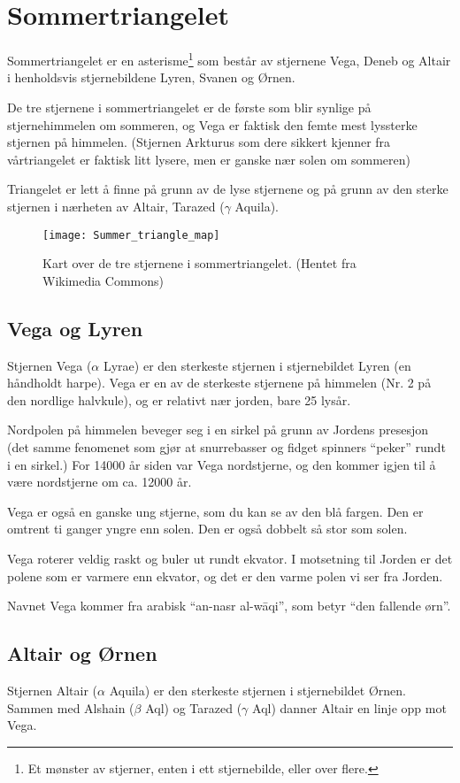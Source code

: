 \documentclass[../SommerstjernerA4.tex]{subfiles}
\begin{document}
\section{Sommertriangelet}
Sommertriangelet er en asterisme\footnote{Et mønster av stjerner, enten i ett stjernebilde, eller over flere.} som består av stjernene Vega, Deneb og Altair i henholdsvis stjernebildene Lyren, Svanen og Ørnen. 

De tre stjernene i sommertriangelet er de første som blir synlige på stjernehimmelen om sommeren, og Vega er faktisk den femte mest lyssterke stjernen på himmelen. (Stjernen Arkturus som dere sikkert kjenner fra vårtriangelet er faktisk litt lysere, men er ganske nær solen om sommeren)

Triangelet er lett å finne på grunn av de lyse stjernene og på grunn av den sterke stjernen i nærheten av Altair, Tarazed ($\gamma$ Aquila).
\begin{figure}[bh]
\centering
\texttt{[image: Summer\_triangle\_map]}
\caption{Kart over de tre stjernene i sommertriangelet. (Hentet fra Wikimedia Commons)}
\end{figure}

\subsection{Vega og Lyren}
Stjernen Vega ($\alpha$ Lyrae) er den sterkeste stjernen i stjernebildet Lyren (en håndholdt harpe). Vega er en av de sterkeste stjernene på himmelen (Nr. 2 på den nordlige halvkule), og er relativt nær jorden, bare 25 lysår.

Nordpolen på himmelen beveger seg i en sirkel på grunn av Jordens presesjon (det samme fenomenet som gjør at snurrebasser og fidget spinners\texttrademark{} ``peker'' rundt i en sirkel.) For 14000 år siden var Vega nordstjerne, og den kommer igjen til å være nordstjerne om ca. 12000 år.

Vega er også en ganske ung stjerne, som du kan se av den blå fargen. Den er omtrent ti ganger yngre enn solen. Den er også dobbelt så stor som solen.

Vega roterer veldig raskt og buler ut rundt ekvator. I motsetning til Jorden er det polene som er varmere enn ekvator, og det er den varme polen vi ser fra Jorden.

Navnet Vega kommer fra arabisk ``an-nasr al-wāqi'', som betyr ``den fallende ørn''.

\subsection{Altair og Ørnen}
Stjernen Altair ($\alpha$ Aquila) er den sterkeste stjernen i stjernebildet Ørnen. Sammen med Alshain ($\beta$ Aql) og Tarazed ($\gamma$ Aql) danner Altair en linje opp mot Vega.
\end{document}
